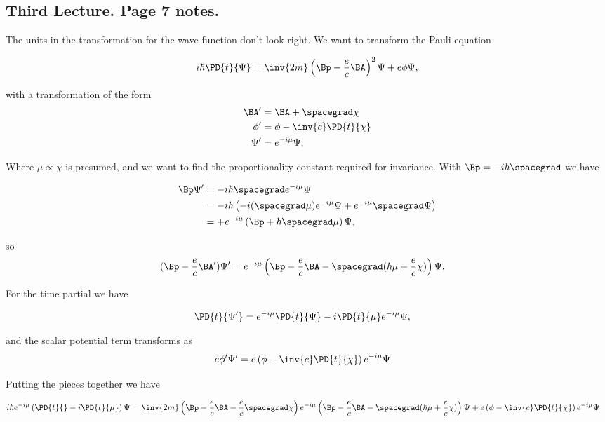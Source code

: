 \subsection{Third Lecture.  Page 7 notes.}

The units in the transformation for the wave function don't look right.  We want to transform the Pauli equation

\begin{align*}
i \hbar \PD{t}{\Psi} = \inv{2 m} \left( \Bp - \frac{e}{c} \BA \right)^2 \Psi + e \phi \Psi,
\end{align*}

with a transformation of the form
\begin{align*}
\BA' &= \BA + \spacegrad \chi \\
\phi' &= \phi - \inv{c} \PD{t}{\chi} \\
\Psi' &= e^{-i \mu} \Psi,
\end{align*}

Where $\mu \propto \chi$ is presumed, and we want to find the proportionality constant required for invariance.  With $\Bp = - i \hbar \spacegrad$ we have

\begin{align*}
\Bp \Psi' 
&=
-i \hbar \spacegrad e^{-i \mu} \Psi \\
&=
-i \hbar \left( 
-i (\spacegrad \mu) e^{-i \mu} \Psi 
+ e^{-i \mu} \spacegrad \Psi  
\right) \\
&=
+ e^{-i \mu} \left( \Bp + \hbar \spacegrad \mu \right) \Psi,
\end{align*}

so
\begin{align*}
(\Bp -\frac{e}{c} \BA' )\Psi' 
&=
e^{-i \mu} \left( \Bp - \frac{e}{c} \BA - \spacegrad (\hbar \mu + \frac{e}{c} \chi) \right) \Psi.
\end{align*}

For the time partial we have

\begin{align*}
\PD{t}{\Psi'} &= e^{-i \mu} \PD{t}{\Psi} -i \PD{t}{\mu} e^{-i \mu} \Psi,
\end{align*}

and the scalar potential term transforms as
\begin{align*}
e \phi' \Psi'
&=
e \left( \phi - \inv{c} \PD{t}{\chi} \right) e^{-i \mu } \Psi
\end{align*}

Putting the pieces together we have

\begin{align*}
i \hbar e^{-i \mu}
\left( \PD{t}{} -i \PD{t}{\mu} \right) \Psi 
&=
\inv{2m}
\left(\Bp -\frac{e}{c} \BA -\frac{e}{c} \spacegrad \chi \right)
e^{-i \mu} \left( \Bp - \frac{e}{c} \BA - \spacegrad (\hbar \mu + \frac{e}{c} \chi) \right) \Psi 
+ e \left( \phi - \inv{c} \PD{t}{\chi} \right) e^{-i \mu } \Psi
\end{align*}

